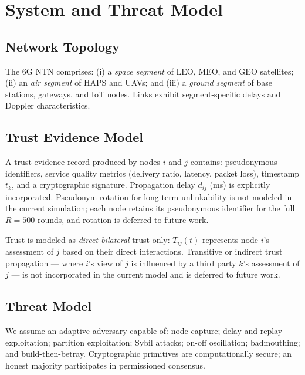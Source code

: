 \documentclass[journal,twoside,10pt]{IEEEtran}
\begin{document}
\section{System and Threat Model}
\label{sec:system}

\subsection{Network Topology}

The 6G NTN comprises: (i) a \emph{space segment} of LEO, MEO, and GEO
satellites; (ii) an \emph{air segment} of HAPS and UAVs; and (iii) a
\emph{ground segment} of base stations, gateways, and IoT nodes.
Links exhibit segment-specific delays and Doppler characteristics.

\subsection{Trust Evidence Model}

A trust evidence record produced by nodes $i$ and $j$ contains:
pseudonymous identifiers, service quality metrics (delivery ratio,
latency, packet loss), timestamp $t_k$, and a cryptographic signature.
Propagation delay $d_{ij}$ (ms) is explicitly incorporated.
Pseudonym rotation for long-term unlinkability is not modeled in the
current simulation; each node retains its pseudonymous identifier for
the full $R\!=\!500$ rounds, and rotation is deferred to future work.

Trust is modeled as \emph{direct bilateral} trust only: $T_{ij}(t)$
represents node $i$'s assessment of $j$ based on their direct
interactions. Transitive or indirect trust propagation --- where $i$'s
view of $j$ is influenced by a third party $k$'s assessment of $j$ ---
is not incorporated in the current model and is deferred to future work.

\subsection{Threat Model}

We assume an adaptive adversary capable of: node capture; delay and
replay exploitation; partition exploitation; Sybil attacks;
on-off oscillation; badmouthing; and build-then-betray.
Cryptographic primitives are computationally secure; an honest majority
participates in permissioned consensus.

\end{document}
